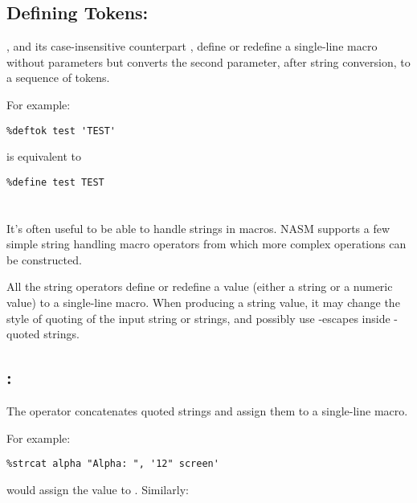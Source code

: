 \subsection{Defining Tokens: }
\label{subsec:deftok}

, and its case-insensitive counterpart ,
define or redefine a single-line macro without parameters but converts
the second parameter, after string conversion, to a sequence of tokens.

For example:

\begin{lstlisting}
%deftok test 'TEST'
\end{lstlisting}

is equivalent to

\begin{lstlisting}
%define test TEST
\end{lstlisting}

\section{}
\label{sec:strlen}

It's often useful to be able to handle strings in macros. NASM
supports a few simple string handling macro operators from which
more complex operations can be constructed.

All the string operators define or redefine a value (either a string
or a numeric value) to a single-line macro. When producing a string
value, it may change the style of quoting of the input string or
strings, and possibly use \code{\textbackslash}-escapes inside
-quoted strings.

\subsection{: }
\label{subsec:strcat}

The  operator concatenates quoted strings and assign
them to a single-line macro.

For example:

\begin{lstlisting}
%strcat alpha "Alpha: ", '12" screen'
\end{lstlisting}

would assign the value  to .
Similarly:

